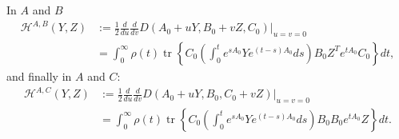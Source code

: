 \documentclass{article}
\newcommand{\tr}{\mathop{\mbox{tr}}} %
\newcommand{\1}{\mathbbm{1}}
\begin{document}
In $A$ and $B$
\begin{equation}
    \begin{aligned}
        \mathcal{H}^{A,B}(Y,Z)
        &:= 
        \frac{1}{2} \frac{d}{du} \frac{d}{dv} D(A_0+uY,B_0+vZ,C_0)\vert_{u=v=0} \\
        &=
        \int_0^\infty \rho(t) \tr\left\{ 
        C_0 \left(\int_0^t e^{s A_0} Y e^{(t-s) A_0} ds \right) B_0
        Z^T e^{t A_0} C_0
        \right\} dt  ,
  \end{aligned}
\end{equation}
and finally in $A$ and $C$:
\begin{equation}
    \begin{aligned}
        \mathcal{H}^{A,C}(Y,Z)
        &:= 
        \frac{1}{2} \frac{d}{du} \frac{d}{dv} D(A_0+uY,B_0,C_0+vZ)\vert_{u=v=0} \\
        &=
        \int_0^\infty \rho(t) \tr\left\{ 
        C_0 \left(\int_0^t e^{s A_0} Y e^{(t-s) A_0} ds \right) B_0
        B_0 e^{t A_0} Z
        \right\} dt  .
  \end{aligned}
\end{equation}
\end{document}
